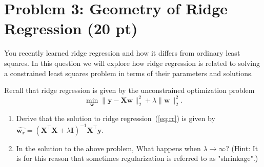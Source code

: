 \documentclass[a4 paper]{article}
\newcommand{\0}{\mathbf{0}}
\begin{document}
\section*{Problem 3: Geometry of Ridge Regression (20 pt)}
You recently learned ridge regression and how it differs from ordinary least squares. In this question we will explore how ridge regression is related to solving a constrained least squares problem in terms of their parameters and solutions.

Recall that ridge regression is given by the unconstrained optimization problem 
\begin{equation}
    \min_{\mathbf{w}} \|\mathbf{y-Xw}\|^2_2 + \lambda \|\mathbf{w}\|^2_2.
\label{eq:rr}
\end{equation}
    
\begin{enumerate}[label=(\alph*)]
    \item Derive that the solution to ridge regression~(\ref{eq:rr}) is given by $\mathbf{\hat{w_r}} = (\mathbf{X^\top X} + \lambda \mathbf{I})^{-1} \mathbf{X^\top y}$. 
    
    \item In the solution to the above problem, What happens when $\lambda \rightarrow \infty$? (Hint: It is for this reason that sometimes regularization is referred to as "shrinkage".)
            
\end{enumerate}
\end{document}
